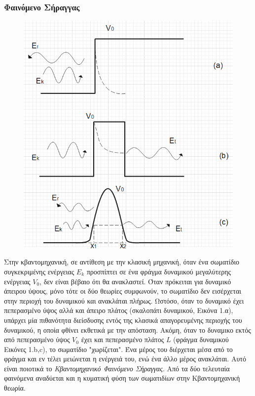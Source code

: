 \documentclass[a4paper]{article}
\begin{document}
\subsubsection*{Φαινόμενο Σήραγγας}
\begin{figure}
\includegraphics[width=0.9\linewidth]{tunneling.png} 
\caption{ }
\label{fig:wrapfig}
\end{figure}
Στην κβαντομηχανική, σε αντίθεση με την κλασική μηχανική, όταν ένα σωματίδιο συγκεκριμένης ενέργειας $E_k$ προσπίπτει σε ένα φράγμα δυναμικού μεγαλύτερης ενέργειας $V_0$, δεν είναι βέβαιο ότι θα ανακλαστεί. 
Όταν πρόκειται για δυναμικό άπειρου ύψους, μόνο τότε οι δύο θεωρίες συμφωνούν, το σωματίδιο δεν εισέρχεται στην περιοχή του δυναμικού και ανακλάται πλήρως. 
Ωστόσο, όταν το δυναμικό έχει πεπερασμένο ύψος αλλά και άπειρο πλάτος (σκαλοπάτι δυναμικού, Εικόνα 1.α), υπάρχει μία πιθανότητα διείσδυσης εντός της κλασικά απαγορευμένης περιοχής του δυναμικού, η οποία φθίνει εκθετικά με την απόσταση.
 Ακόμη, όταν το δυναμικο εκτός από πεπερασμένο ύψος $V_0$ έχει και πεπερασμένο πλάτος $L$ (φράγμα δυναμικού Εικόνες 1.b,c), το σωματίδιο "χωρίζεται". Ένα μέρος του διέρχεται μέσα από το φράγμα και εν τέλει μειώνεται η ενέργειά του, ενώ ένα άλλο μέρος ανακλάται. Αυτό είναι ποιοτικά το \textit{ Κβαντομηχανικό Φαινόμενο Σήραγγας}. Από τα δύο τελευταία φαινόμενα αναδύεται και η κυματική φύση των σωματιδίων στην Κβαντομηχανική θεωρία.
\end{document}
